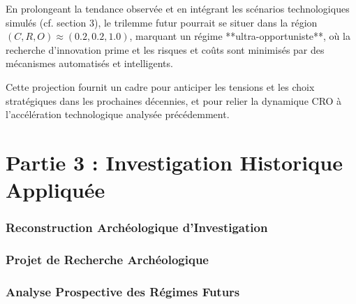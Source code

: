 \documentclass[12pt, a4em]{article}
\begin{document}
	En prolongeant la tendance observée et en intégrant les scénarios technologiques simulés (cf. section 3), le trilemme futur pourrait se situer dans la région $(C,R,O) \approx (0.2,0.2,1.0)$, marquant un régime **ultra-opportuniste**, où la recherche d’innovation prime et les risques et coûts sont minimisés par des mécanismes automatisés et intelligents.
	
	\noindent
	Cette projection fournit un cadre pour anticiper les tensions et les choix stratégiques dans les prochaines décennies, et pour relier la dynamique CRO à l’accélération technologique analysée précédemment.
	
	\part*{ Partie 3 : Investigation Historique Appliquée}
	\section{Reconstruction Archéologique d’Investigation}
	\section{ Projet de Recherche Archéologique}
	\section{Analyse Prospective des Régimes Futurs}
	
	
	
\end{document}
